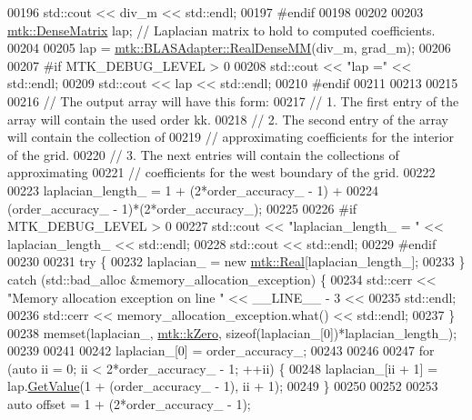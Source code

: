 \begin{DoxyCode}
00196   std::cout << div\_m << std::endl;
00197 \textcolor{preprocessor}{  #endif}
00198 
00202 
00203   \hyperlink{classmtk_1_1DenseMatrix}{mtk::DenseMatrix} lap; \textcolor{comment}{// Laplacian matrix to hold to computed coefficients.}
00204 
00205   lap = \hyperlink{classmtk_1_1BLASAdapter_acebd0e9bfe0bdd609c7fbea98ccfd3b5}{mtk::BLASAdapter::RealDenseMM}(div\_m, grad\_m);
00206 
00207 \textcolor{preprocessor}{  #if MTK\_DEBUG\_LEVEL > 0}
00208   std::cout << \textcolor{stringliteral}{"lap ="} << std::endl;
00209   std::cout << lap << std::endl;
00210 \textcolor{preprocessor}{  #endif}
00211 
00213 
00215 
00216   \textcolor{comment}{// The output array will have this form:}
00217   \textcolor{comment}{// 1. The first entry of the array will contain the used order kk.}
00218   \textcolor{comment}{// 2. The second entry of the array will contain the collection of}
00219   \textcolor{comment}{// approximating coefficients for the interior of the grid.}
00220   \textcolor{comment}{// 3. The next entries will contain the collections of approximating}
00221   \textcolor{comment}{// coefficients for the west boundary of the grid.}
00222 
00223   laplacian\_length\_ = 1 + (2*order\_accuracy\_ - 1) +
00224     (order\_accuracy\_ - 1)*(2*order\_accuracy\_);
00225 
00226 \textcolor{preprocessor}{  #if MTK\_DEBUG\_LEVEL > 0}
00227   std::cout << \textcolor{stringliteral}{"laplacian\_length\_ = "} << laplacian\_length\_ << std::endl;
00228   std::cout << std::endl;
00229 \textcolor{preprocessor}{  #endif}
00230 
00231   \textcolor{keywordflow}{try} \{
00232     laplacian\_ = \textcolor{keyword}{new} \hyperlink{group__c01-roots_gac080bbbf5cbb5502c9f00405f894857d}{mtk::Real}[laplacian\_length\_];
00233   \} \textcolor{keywordflow}{catch} (std::bad\_alloc &memory\_allocation\_exception) \{
00234     std::cerr << \textcolor{stringliteral}{"Memory allocation exception on line "} << \_\_LINE\_\_ - 3 <<
00235       std::endl;
00236     std::cerr << memory\_allocation\_exception.what() << std::endl;
00237   \}
00238   memset(laplacian\_, \hyperlink{group__c01-roots_ga59a451a5fae30d59649bcda274fea271}{mtk::kZero}, \textcolor{keyword}{sizeof}(laplacian\_[0])*laplacian\_length\_);
00239 
00241 
00242   laplacian\_[0] = order\_accuracy\_;
00243 
00246 
00247   \textcolor{keywordflow}{for} (\textcolor{keyword}{auto} ii = 0; ii < 2*order\_accuracy\_ - 1; ++ii) \{
00248     laplacian\_[ii + 1] = lap.\hyperlink{classmtk_1_1DenseMatrix_a4b23ecbebd970b5eea915dbb50691024}{GetValue}(1 + (order\_accuracy\_ - 1), ii + 1);
00249   \}
00250 
00252 
00253   \textcolor{keyword}{auto} offset = 1 + (2*order\_accuracy\_ - 1);

\end{DoxyCode}
